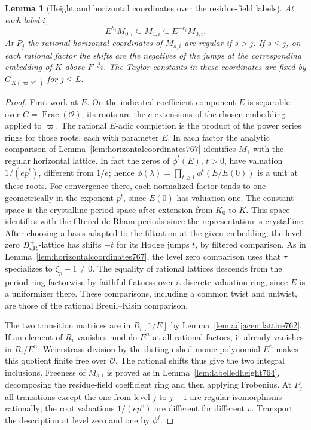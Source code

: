 \documentclass[a4paper,11pt]{article}
\newtheorem{lemma}[proposition]{Lemma}
\theoremstyle{definition}
\theoremstyle{remark}
\numberwithin{equation}{section}
\begin{document}
\begin{lemma}[Height and horizontal coordinates over the residue-field labels]
\leavevmode\label{lem:ramifiedcoordinates782}
At each label \(i\),
\[
        E^{h_i}M_{0,i}\subseteq M_{1,i}
                    \subseteq E^{-r_i}M_{0,i}.
\]
At \(P_j\) the rational horizontal coordinates of
\(M_{s,i}\) are regular if \(s>j\). If \(s\le j\), on
each rational factor the shifts are the negatives of
the jumps at the corresponding embedding of \(K\) above
\(F^{-j}i\). The Taylor constants in these coordinates
are fixed by \(G_{K(\varpi^{1/p^L})}\) for \(j\le L\).
\end{lemma}
\begin{proof}
First work at \(E\). On the indicated coefficient
component \(E\) is separable over \(C=\operatorname{Frac}
(\mathcal O)\); its roots are the \(e\) extensions of
the chosen embedding applied to \(\varpi\). The rational
\(E\)-adic completion is the product of the power series
rings for those roots, each with parameter \(E\).
In each factor the analytic comparison of
Lemma~\ref{lem:horizontalcoordinates767} identifies
\(M_1\) with the regular horizontal lattice. In fact the
zeros of \(\phi^t(E)\), \(t>0\), have valuation
\(1/(ep^t)\), different from \(1/e\); hence
\(\phi(\lambda)=\prod_{t\ge1}\phi^t(E/E(0))\) is a unit
at these roots. For convergence there, each normalized
factor tends to one geometrically in the exponent \(p^t\),
since \(E(0)\) has valuation one. The constant space is
the crystalline period space after extension from \(K_0\)
to \(K\). This space identifies with the filtered de Rham
periods since the representation is crystalline.
After choosing a basis adapted to the filtration at the
given embedding, the level zero \(B_{\rm dR}^+\)-lattice
has shifts \(-t\) for its Hodge jumps \(t\), by filtered
comparison. As in Lemma~\ref{lem:horizontalcoordinates767},
the level zero comparison uses that \(\tau\) specializes
to \(\zeta_p-1\ne0\). The equality of rational lattices
descends from the period ring factorwise by faithful
flatness over a discrete valuation ring, since \(E\)
is a uniformizer there. These comparisons, including a
common twist and untwist, are those of the rational
Breuil--Kisin comparison.~\cite[Section~2.1]{III-II-bartlettcrys767}

The two transition matrices are in \(R_i[1/E]\) by
Lemma~\ref{lem:adjacentlattice762}. If an element of
\(R_i\) vanishes modulo \(E^n\) at all rational factors,
it already vanishes in \(R_i/E^n\): Weierstrass division
by the distinguished monic polynomial \(E^n\) makes
this quotient finite free over \(\mathcal O\). The
rational shifts thus give the two integral inclusions.
Freeness of \(M_{s,i}\) is proved as in
Lemma~\ref{lem:labelledheight764}, decomposing the
residue-field coefficient ring and then applying
Frobenius. At \(P_j\) all transitions except the one
from level \(j\) to \(j+1\) are regular isomorphisms
rationally; the root valuations \(1/(ep^v)\) are
different for different \(v\). Transport the description
at level zero and one by \(\phi^j\).


\end{proof}
\end{document}
